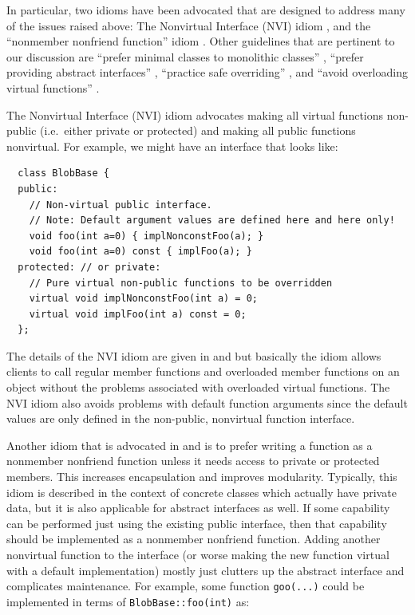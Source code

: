 \documentclass[pdf,ps2pdf,11pt]{SANDreport}
\begin{document}
In particular, two idioms have been advocated that are designed to address
many of the issues raised above: The Nonvirtual Interface (NVI) idiom
{}\cite[Item 39]{C++CodingStandards05}, and the ``nonmember nonfriend
function'' idiom {}\cite[Item 44]{C++CodingStandards05}.  Other guidelines
that are pertinent to our discussion are ``prefer minimal classes to
monolithic classes'' {}\cite[Item 33]{C++CodingStandards05}, ``prefer
providing abstract interfaces'' {}\cite[Item 36]{C++CodingStandards05},
``practice safe overriding'' {}\cite[Item 38]{C++CodingStandards05}
{}\cite[Gotcha 74]{C++Gotchas03}, and ``avoid overloading virtual functions''
{}\cite[Gotcha 73]{C++Gotchas03}.

The Nonvirtual Interface (NVI) idiom {}\cite[Item 35]{EffectiveC++3rd}
advocates making all virtual functions non-public (i.e.\ either private or
protected) and making all public functions nonvirtual.  For example, we might
have an interface that looks like:

{\small\begin{verbatim}
  class BlobBase {
  public:
    // Non-virtual public interface.
    // Note: Default argument values are defined here and here only!
    void foo(int a=0) { implNonconstFoo(a); }
    void foo(int a=0) const { implFoo(a); }
  protected: // or private:
    // Pure virtual non-public functions to be overridden
    virtual void implNonconstFoo(int a) = 0;
    virtual void implFoo(int a) const = 0;
  };
\end{verbatim}}

The details of the NVI idiom are given in {}\cite[Item
39]{C++CodingStandards05} and {}\cite[Item 35]{EffectiveC++3rd} but basically
the idiom allows clients to call regular member functions and overloaded
member functions on an object without the problems associated with overloaded
virtual functions.  The NVI idiom also avoids problems with default function
arguments since the default values are only defined in the non-public,
nonvirtual function interface.

Another idiom that is advocated in {}\cite[Item 44]{C++CodingStandards05} and
{}\cite[Item 23]{EffectiveC++3rd} is to prefer writing a function as a
nonmember nonfriend function unless it needs access to private or protected
members.  This increases encapsulation and improves modularity.  Typically,
this idiom is described in the context of concrete classes which actually have
private data, but it is also applicable for abstract interfaces as well.  If
some capability can be performed just using the existing public interface,
then that capability should be implemented as a nonmember nonfriend function.
Adding another nonvirtual function to the interface (or worse making the new
function virtual with a default implementation) mostly just clutters up the
abstract interface and complicates maintenance.  For example, some function
{}\texttt{goo(...)} could be implemented in terms of
{}\texttt{BlobBase\-::foo(int)} as:
\end{document}
